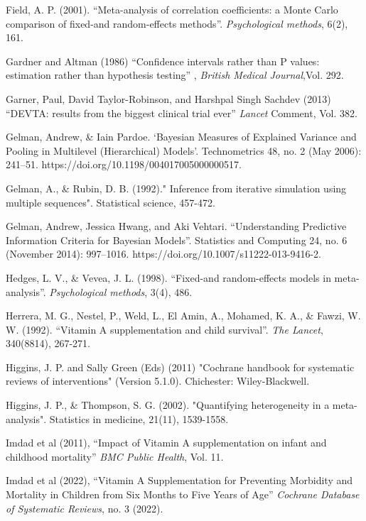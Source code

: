 \documentclass[12pt]{article}
\begin{document}
\begin{thebibliography}{99}
 Field, A. P. (2001). ``Meta-analysis of correlation coefficients: a Monte Carlo comparison of fixed-and random-effects methods''. \emph{Psychological methods}, 6(2), 161.

 Gardner and Altman (1986) ``Confidence intervals rather than P values: estimation rather than hypothesis testing'' , \emph{British Medical Journal},Vol. 292.

 Garner, Paul, David Taylor-Robinson, and Harshpal Singh Sachdev (2013) ``DEVTA: results from the biggest clinical trial ever'' \emph{Lancet} Comment, Vol. 382.

 Gelman, Andrew, \& Iain Pardoe. ‘Bayesian Measures of Explained Variance and Pooling in Multilevel (Hierarchical) Models’. Technometrics 48, no. 2 (May 2006): 241–51. https://doi.org/10.1198/004017005000000517.

 Gelman, A., \& Rubin, D. B. (1992)." Inference from iterative simulation using multiple sequences". Statistical science, 457-472.

 Gelman, Andrew, Jessica Hwang, and Aki Vehtari. ``Understanding Predictive Information Criteria for Bayesian Models''. Statistics and Computing 24, no. 6 (November 2014): 997–1016. https://doi.org/10.1007/s11222-013-9416-2.

 Hedges, L. V., \& Vevea, J. L. (1998). ``Fixed-and random-effects models in meta-analysis''. \emph{Psychological methods}, 3(4), 486.

 Herrera, M. G., Nestel, P., Weld, L., El Amin, A., Mohamed, K. A., \& Fawzi, W. W. (1992). ``Vitamin A supplementation and child survival''. \emph{The Lancet}, 340(8814), 267-271.

 Higgins, J. P. and Sally Green (Eds) (2011) "Cochrane handbook for systematic reviews of interventions" (Version 5.1.0). Chichester: Wiley-Blackwell.

 Higgins, J. P., \& Thompson, S. G. (2002). "Quantifying heterogeneity in a meta-analysis". Statistics in medicine, 21(11), 1539-1558.

 Imdad et al (2011), ``Impact of Vitamin A supplementation on infant and childhood mortality'' \emph{BMC Public Health}, Vol. 11.

 Imdad et al (2022), ``Vitamin A Supplementation for Preventing Morbidity and Mortality in Children from Six Months to Five Years of Age'' \emph{Cochrane Database of Systematic Reviews}, no. 3 (2022).


\end{thebibliography}
\end{document}
